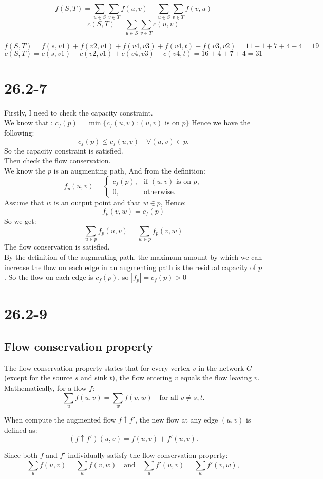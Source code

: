 \documentclass[12pt]{article}
\begin{document}
\[f(S, T) = \sum_{u \in S} \sum_{v \in T} f(u, v) - \sum_{u \in S} \sum_{v \in T} f(v, u)\]
\[c(S, T) = \sum_{u \in S} \sum_{v \in T} c(u, v)\]

\[f(S, T) = f(s,v1)+f(v2,v1)+f(v4,v3)+f(v4,t) - f(v3,v2) = 11+1+7+4-4=19\]
\[c(S, T) = c(s,v1)+c(v2,v1)+c(v4,v3)+c(v4,t)=16+4+7+4=31\]
\section{26.2-7}
Firstly, I need to check the capacity constraint.\\
We know that : \(c_f(p) = \min \{ c_f(u, v) : (u, v) \text{ is on } p \}\)
Hence we have the following:
\[c_f(p) \leq c_f(u, v) \quad \forall (u, v) \in p.\]
So the capacity constraint is satisfied.\\
Then check the flow conservation.\\
We know the \(p\) is an augmenting path, And from the definition:
\[f_p(u, v) =
\begin{cases} 
c_f(p), & \text{if } (u, v) \text{ is on } p, \\ 
0, & \text{otherwise}.
\end{cases}\]
Assume that \(w\) is an output point and that \(w \in p\), Hence:
\[f_p(v, w) = c_f(p)\]
So we get: 
\[\sum_{u \in p} f_p(u, v) =\sum_{w \in p} f_p(v, w)\]
The flow conservation is satisfied.\\
By the definition of the augmenting path, the maximum amount by which we can increase the flow on each edge in an augmenting path is the residual capacity of \(p\).
So the flow on each edge is \(c_f(p)\), so \( |f_p| = c_f(p)> 0\)
\section{26.2-9}
\subsection{Flow conservation property}
The flow conservation property states that for every vertex $v$ in the network $G$ (except for the source $s$ and sink $t$), the flow entering $v$ equals the flow leaving $v$. Mathematically, for a flow $f$:
\[
\sum_{u} f(u, v) = \sum_{w} f(v, w) \quad \text{for all } v \neq s, t.
\]

When compute the augmented flow $f \uparrow f'$, the new flow at any edge $(u, v)$ is defined as:
\[
(f \uparrow f')(u, v) = f(u, v) + f'(u, v).
\]

Since both $f$ and $f'$ individually satisfy the flow conservation property:
\[
\sum_{u} f(u, v) = \sum_{w} f(v, w) \quad \text{and} \quad \sum_{u} f'(u, v) = \sum_{w} f'(v, w),
\]
\end{document}
